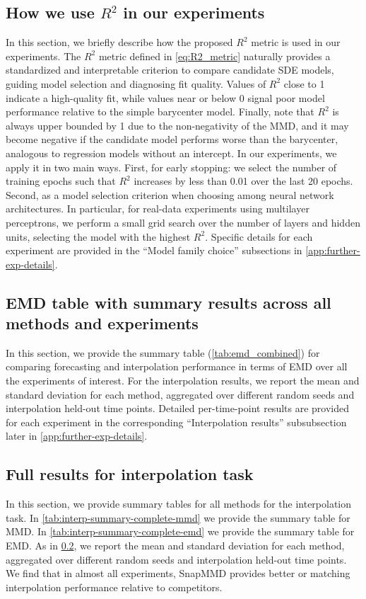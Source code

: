 \subsection{How we use $R^2$ in our experiments}
\label{app:use-r2-experiments}
In this section, we briefly describe how the proposed $R^2$ metric is used in our experiments. The \(R^2\) metric defined in \cref{eq:R2_metric} naturally provides a standardized and interpretable criterion to compare candidate SDE models, guiding model selection and diagnosing fit quality. Values of \(R^2\) close to 1 indicate a high-quality fit, while values near or below 0 signal poor model performance relative to the simple barycenter model. Finally, note that \(R^2\) is always upper bounded by 1 due to the non-negativity of the MMD, and it may become negative if the candidate model performs worse than the barycenter, analogous to regression models without an intercept. In our experiments, we apply it in two main ways. First, for early stopping: we select the number of training epochs such that $R^2$ increases by less than 0.01 over the last 20 epochs. Second, as a model selection criterion when choosing among neural network architectures. In particular, for real-data experiments using multilayer perceptrons, we perform a small grid search over the number of layers and hidden units, selecting the model with the highest $R^2$. Specific details for each experiment are provided in the “Model family choice” subsections in \cref{app:further-exp-details}.

\subsection{EMD table with summary results across all methods and experiments}
\label{app:emd-big-table}
In this section, we provide the summary table (\cref{tab:emd_combined}) for comparing forecasting and interpolation performance in terms of EMD over all the experiments of interest. For the interpolation results, we report the mean and standard deviation for each method, aggregated over different random seeds and interpolation held-out time points. Detailed per-time-point results are provided for each experiment in the corresponding “Interpolation results” subsubsection later in \cref{app:further-exp-details}. 



\subsection{Full results for interpolation task}
\label{app:complete-summary-interpolation}
In this section, we provide summary tables for all methods for the interpolation task. In \cref{tab:interp-summary-complete-mmd} we provide the summary table for MMD. In \cref{tab:interp-summary-complete-emd} we provide the summary table for EMD. As in \cref{app:emd-big-table}, we report the mean and standard deviation for each method, aggregated over different random seeds and interpolation held-out time points. We find that in almost all experiments, SnapMMD provides better or matching interpolation performance relative to competitors.

